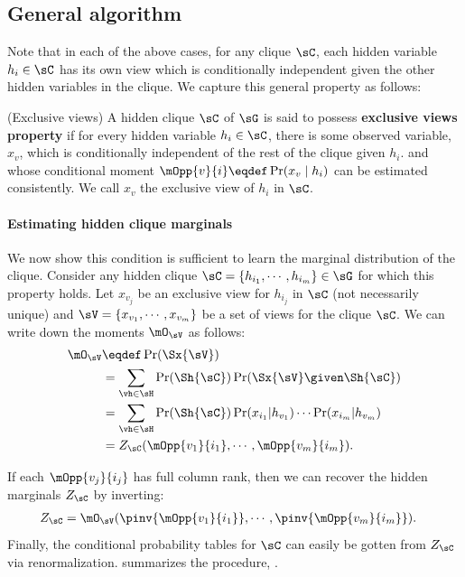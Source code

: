 \subsection{General algorithm}
\label{sec:directedGeneral}

Note that in each of the above cases,
  for any clique $\sC$, each hidden variable $h_i \in \sC$ has its own
  view which is conditionally independent given the other hidden variables in
  the clique.
We capture this general property as follows:
\begin{property}(Exclusive views)
  \label{prop:exclusive-views}
  A hidden clique $\sC$ of $\sG$ is said to possess \textbf{exclusive views property} if for every hidden variable $h_i \in \sC$,
  there is some observed variable, $x_{v}$, which is conditionally
  independent of the rest of the clique given $h_i$.
  and whose conditional
  moment $\mOpp{v}{i} \eqdef \Pr(x_{v} \mid h_i)$ can be estimated consistently.
We call $x_v$ the exclusive view of $h_i$ in $\sC$.
\end{property}

\paragraph{Estimating hidden clique marginals}

We now show this condition is sufficient to learn the marginal
  distribution of the clique.
Consider any hidden clique $\sC = \{h_{i_1}, \cdots, h_{i_m}\} \in \sG$ for which this property holds. Let
  $x_{v_j}$ be an exclusive view for $h_{i_j}$ in $\sC$ (not necessarily unique) and $\sV
  = \{x_{v_1}, \cdots, x_{v_m}\}$ be a set of views for the clique $\sC$.
We can write down the moments $\mO_\sV$ as follows:
\begin{align*}
  \mO_\sV 
  &\eqdef \Pr(\Sx{\sV}) \\
  &= \sum_{\vh \in \sH}
      \Pr(\Sh{\sC}) \Pr(\Sx{\sV} \given \Sh{\sC}) \\
      &= \sum_{\vh \in \sH} \Pr(\Sh{\sC}) 
          \Pr(x_{i_1} | h_{v_1}) \cdots \Pr(x_{i_m} | h_{v_m}) \\
    &= Z_{\sC}(\mOpp{v_1}{i_1},\cdots,\mOpp{v_m}{i_m}).
\end{align*}

If each $\mOpp{v_j}{i_j}$ has full column rank, then we can recover the
hidden marginals $Z_\sC$ by inverting:
\begin{align*}
  Z_{\sC} &= \mO_\sV(\pinv{\mOpp{v_1}{i_1}},\cdots,\pinv{\mOpp{v_m}{i_m}}).
\end{align*}
Finally, the conditional probability tables for $\sC$ can easily be gotten from
  $Z_\sC$ via renormalization.
 summarizes the procedure, \LearnClique.

